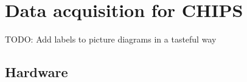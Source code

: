 \chapter{Data acquisition for CHIPS} %
\label{chap:daq} %

TODO: Add labels to picture diagrams in a tasteful way

\section{Hardware} %
\label{sec:daq_hard} %

